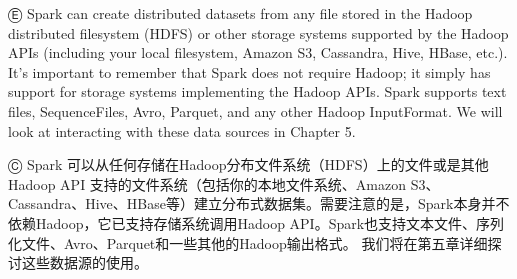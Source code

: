 Ⓔ \textcolor{etc}{Spark can create distributed datasets from any file stored in the Hadoop distributed filesystem (HDFS) or other storage systems supported by the Hadoop APIs (including your local filesystem, Amazon S3, Cassandra, Hive, HBase, etc.). It's important to remember that Spark does not require Hadoop; it simply has support for storage systems implementing the Hadoop APIs. Spark supports text files, SequenceFiles, Avro, Parquet, and any other Hadoop InputFormat. We will look at interacting with these data sources in Chapter 5.}

Ⓒ Spark 可以从任何存储在Hadoop分布文件系统（HDFS）上的文件或是其他Hadoop API 支持的文件系统（包括你的本地文件系统、Amazon S3、Cassandra、Hive、HBase等）建立分布式数据集。需要注意的是，Spark本身并不依赖Hadoop，它已支持存储系统调用Hadoop API。Spark也支持文本文件、序列化文件、Avro、Parquet和一些其他的Hadoop输出格式。 我们将在第五章详细探讨这些数据源的使用。
